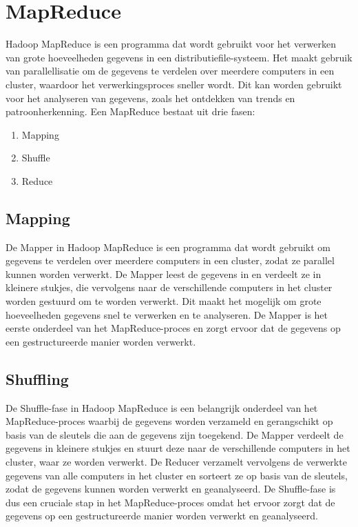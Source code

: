 \documentclass[a4paper,10pt,twoside]{report}
\begin{document}
\section{MapReduce}

Hadoop MapReduce is een programma dat wordt gebruikt voor het verwerken van grote hoeveelheden gegevens in een distributiefile-systeem. Het maakt gebruik van parallellisatie om de gegevens te verdelen over meerdere computers in een cluster, waardoor het verwerkingsproces sneller wordt. Dit kan worden gebruikt voor het analyseren van gegevens, zoals het ontdekken van trends en patroonherkenning. Een MapReduce bestaat uit drie fasen:

\begin{enumerate}
	\item Mapping
	\item Shuffle
	\item Reduce
\end{enumerate}

\subsection{Mapping}

De Mapper in Hadoop MapReduce is een programma dat wordt gebruikt om gegevens te verdelen over meerdere computers in een cluster, zodat ze parallel kunnen worden verwerkt. De Mapper leest de gegevens in en verdeelt ze in kleinere stukjes, die vervolgens naar de verschillende computers in het cluster worden gestuurd om te worden verwerkt. Dit maakt het mogelijk om grote hoeveelheden gegevens snel te verwerken en te analyseren. De Mapper is het eerste onderdeel van het MapReduce-proces en zorgt ervoor dat de gegevens op een gestructureerde manier worden verwerkt.

\subsection{Shuffling}

De Shuffle-fase in Hadoop MapReduce is een belangrijk onderdeel van het MapReduce-proces waarbij de gegevens worden verzameld en gerangschikt op basis van de sleutels die aan de gegevens zijn toegekend. De Mapper verdeelt de gegevens in kleinere stukjes en stuurt deze naar de verschillende computers in het cluster, waar ze worden verwerkt. De Reducer verzamelt vervolgens de verwerkte gegevens van alle computers in het cluster en sorteert ze op basis van de sleutels, zodat de gegevens kunnen worden verwerkt en geanalyseerd. De Shuffle-fase is dus een cruciale stap in het MapReduce-proces omdat het ervoor zorgt dat de gegevens op een gestructureerde manier worden verwerkt en geanalyseerd.
\end{document}
